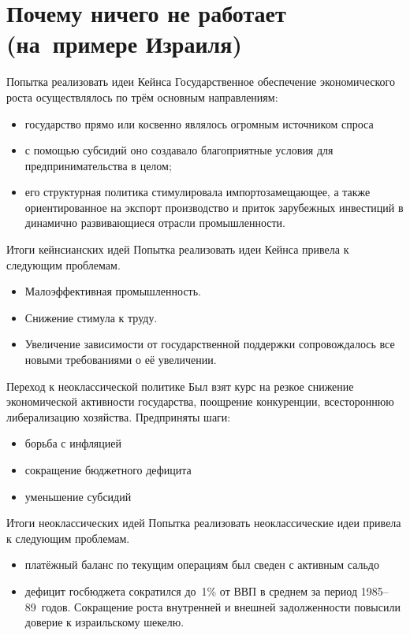 \documentclass{beamer}
\begin{document}
	\section{Почему ничего не работает (на~примере Израиля)}
	
	\begin{frame}{Попытка реализовать идеи Кейнса}
		Государственное обеспечение экономического роста осуществлялось по трём основным направлениям:
		\begin{itemize}
		\item государство прямо или косвенно являлось огромным источником спроса
		\item с помощью субсидий оно создавало благоприятные условия для предпринимательства в целом;
		\item его структурная политика стимулировала импортозамещающее, а также ориентированное на экспорт производство и приток зарубежных инвестиций в динамично развивающиеся отрасли промышленности.
		\end{itemize}
	\end{frame}

	\begin{frame}{Итоги кейнсианских идей}
		Попытка реализовать идеи Кейнса привела к следующим проблемам.
		\begin{itemize}
			\item Малоэффективная промышленность.
			\item Снижение стимула к труду.
			\item Увеличение зависимости от государственной поддержки сопровождалось все новыми требованиями о её увеличении.
		\end{itemize}
	\end{frame}

	\begin{frame}{Переход к неоклассической политике}
		Был взят курс на резкое снижение экономической активности государства, поощрение конкуренции, всестороннюю либерализацию хозяйства.
		Предприняты шаги:
		\begin{itemize}
		\item борьба с инфляцией
		\item сокращение бюджетного дефицита
		\item уменьшение субсидий
		\end{itemize}
	\end{frame}
	
	\begin{frame}{Итоги неоклассических идей}
		Попытка реализовать неоклассические идеи привела к следующим проблемам.
		\begin{itemize}
			\item платёжный баланс по текущим операциям был сведен с активным сальдо
			\item дефицит госбюджета сократился до~1\% от ВВП в среднем за период 1985--89~годов.
			Сокращение роста внутренней и внешней задолженности повысили доверие к израильскому шекелю.
		\end{itemize}
	\end{frame}
	
\end{document}
